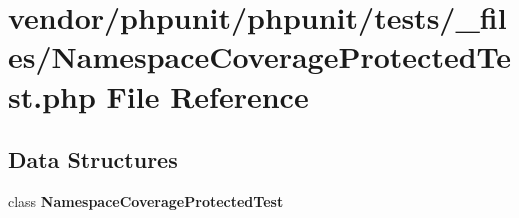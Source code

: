 \section{vendor/phpunit/phpunit/tests/\+\_\+files/\+Namespace\+Coverage\+Protected\+Test.php File Reference}
\label{phpunit_2tests_2__files_2_namespace_coverage_protected_test_8php}
\subsection*{Data Structures}
\begin{DoxyCompactItemize}
\item 
class {\bf Namespace\+Coverage\+Protected\+Test}
\end{DoxyCompactItemize}
